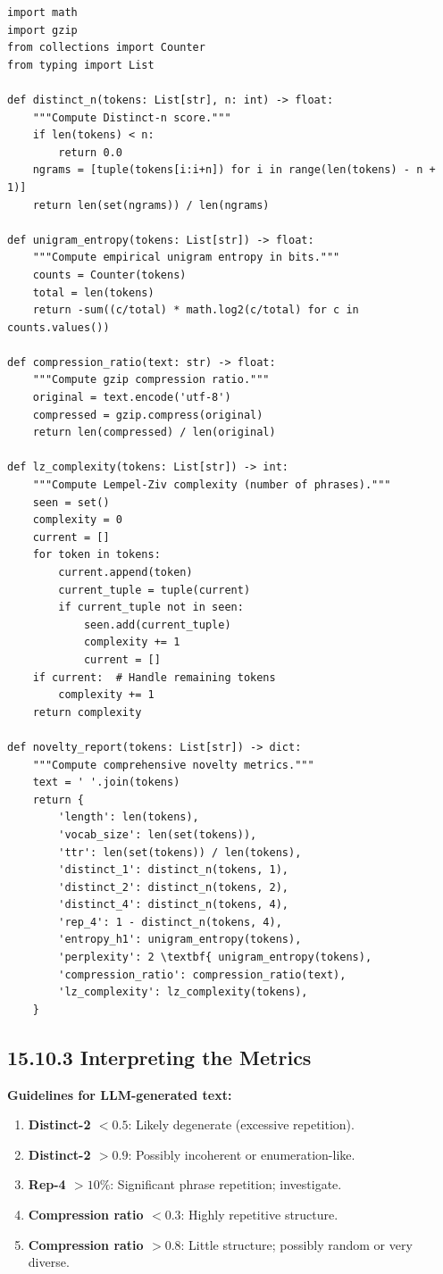 \begin{verbatim}
import math
import gzip
from collections import Counter
from typing import List

def distinct_n(tokens: List[str], n: int) -> float:
    """Compute Distinct-n score."""
    if len(tokens) < n:
        return 0.0
    ngrams = [tuple(tokens[i:i+n]) for i in range(len(tokens) - n + 1)]
    return len(set(ngrams)) / len(ngrams)

def unigram_entropy(tokens: List[str]) -> float:
    """Compute empirical unigram entropy in bits."""
    counts = Counter(tokens)
    total = len(tokens)
    return -sum((c/total) * math.log2(c/total) for c in counts.values())

def compression_ratio(text: str) -> float:
    """Compute gzip compression ratio."""
    original = text.encode('utf-8')
    compressed = gzip.compress(original)
    return len(compressed) / len(original)

def lz_complexity(tokens: List[str]) -> int:
    """Compute Lempel-Ziv complexity (number of phrases)."""
    seen = set()
    complexity = 0
    current = []
    for token in tokens:
        current.append(token)
        current_tuple = tuple(current)
        if current_tuple not in seen:
            seen.add(current_tuple)
            complexity += 1
            current = []
    if current:  # Handle remaining tokens
        complexity += 1
    return complexity

def novelty_report(tokens: List[str]) -> dict:
    """Compute comprehensive novelty metrics."""
    text = ' '.join(tokens)
    return {
        'length': len(tokens),
        'vocab_size': len(set(tokens)),
        'ttr': len(set(tokens)) / len(tokens),
        'distinct_1': distinct_n(tokens, 1),
        'distinct_2': distinct_n(tokens, 2),
        'distinct_4': distinct_n(tokens, 4),
        'rep_4': 1 - distinct_n(tokens, 4),
        'entropy_h1': unigram_entropy(tokens),
        'perplexity': 2 \textbf{ unigram_entropy(tokens),
        'compression_ratio': compression_ratio(text),
        'lz_complexity': lz_complexity(tokens),
    }
\end{verbatim}

\subsection{15.10.3 Interpreting the Metrics}

\textbf{Guidelines for LLM-generated text:}

\begin{enumerate}
\item \textbf{Distinct-2 $< 0.5$}: Likely degenerate (excessive repetition).
\item \textbf{Distinct-2 $> 0.9$}: Possibly incoherent or enumeration-like.
\item \textbf{Rep-4 $> 10\%$}: Significant phrase repetition; investigate.
\item \textbf{Compression ratio $< 0.3$}: Highly repetitive structure.
\item \textbf{Compression ratio $> 0.8$}: Little structure; possibly random or very diverse.
\end{enumerate}

